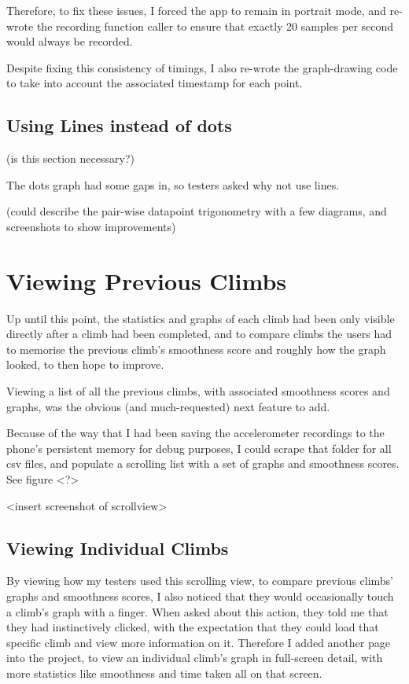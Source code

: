 Therefore, to fix these issues, I forced the app to remain in portrait mode, and re-wrote the recording function caller to ensure that exactly 20 samples per second would always be recorded.

Despite fixing this consistency of timings, I also re-wrote the graph-drawing code to take into account the associated timestamp for each point.

\subsection{Using Lines instead of dots}

(is this section necessary?)

The dots graph had some gaps in, so testers asked why not use lines.

(could describe the pair-wise datapoint trigonometry with a few diagrams, and screenshots to show improvements)


\section{Viewing Previous Climbs}
Up until this point, the statistics and graphs of each climb had been only visible directly after a climb had been completed, and to compare climbs the users had to memorise the previous climb's smoothness score and roughly how the graph looked, to then hope to improve.

Viewing a list of all the previous climbs, with associated smoothness scores and graphs, was the obvious (and much-requested) next feature to add.

Because of the way that I had been saving the accelerometer recordings to the phone's persistent memory for debug purposes, I could scrape that folder for all csv files, and populate a scrolling list with a set of graphs and smoothness scores.
See figure <?>

<insert screenshot of scrollview>

\subsection{Viewing Individual Climbs}
By viewing how my testers used this scrolling view, to compare previous climbs' graphs and smoothness scores, I also noticed that they would occasionally touch a climb's graph with a finger.
When asked about this action, they told me that they had instinctively clicked, with the expectation that they could load that specific climb and view more information on it.
Therefore I added another page into the project, to view an individual climb's graph in full-screen detail, with more statistics like smoothness and time taken all on that screen.

